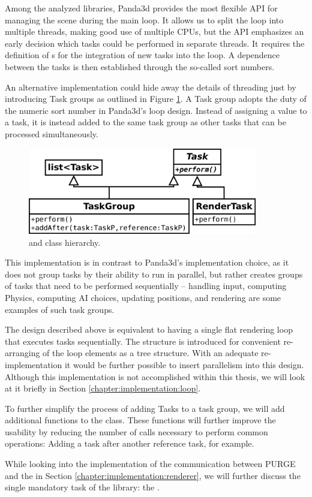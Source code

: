 	Among the analyzed libraries, Panda3d provides the most flexible API for managing the scene during the main loop. It allows us to split the loop into multiple threads, making good use of multiple CPUs, but the API emphasizes an early decision which tasks could be performed in separate threads. It requires the definition of s for the integration of new tasks into the loop. A dependence between the tasks is then established through the so-called sort numbers.

	An alternative implementation could hide away the details of threading just by introducing Task groups as outlined in Figure \ref{fig:Task}. A Task group adopts the duty of the numeric sort number in Panda3d's loop design. Instead of assigning a value to a task, it is instead added to the same task group as other tasks that can be processed simultaneously.
	
	\begin{figure}[htbp]
		\centering
		\includegraphics[width=10cm]{images/Task.png}
		\caption{ and  class hierarchy.}
		\label{fig:Task}
	\end{figure}

	This implementation is in contrast to Panda3d's implementation choice, as it does not group tasks by their ability to run in parallel, but rather creates groups of tasks that need to be performed sequentially -- handling input, computing Physics, computing AI choices, updating positions, and rendering are some examples of such task groups.

	The design described above is equivalent to having a single flat rendering loop that executes tasks sequentially. The  structure is introduced for convenient re-arranging of the loop elements as a tree structure. With an adequate  re-implementation it would be further possible to insert parallelism into this design. Although this implementation is not accomplished within this thesis, we will look at it briefly in Section \ref{chapter:implementation:loop}.

	To further simplify the process of adding Tasks to a task group, we will add additional functions to the  class. These functions will further improve the usability by reducing the number of calls necessary to perform common operations: Adding a task after another reference task, for example.

	While looking into the implementation of the communication between PURGE and the  in Section \ref{chapter:implementation:renderer}, we will further discuss the single mandatory task of the library: the .

